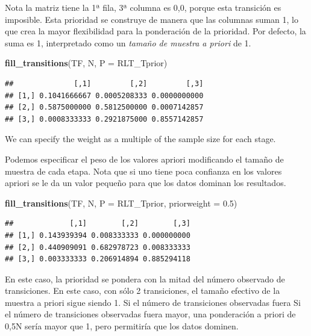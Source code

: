 \documentclass[
]{book}
\newenvironment{Shaded}{\begin{snugshade}}{\end{snugshade}}
\newcommand{\AttributeTok}[1]{\textcolor[rgb]{0.13,0.29,0.53}{#1}}
\newcommand{\FloatTok}[1]{\textcolor[rgb]{0.00,0.00,0.81}{#1}}
\newcommand{\FunctionTok}[1]{\textcolor[rgb]{0.13,0.29,0.53}{\textbf{#1}}}
\newcommand{\NormalTok}[1]{#1}
\theoremstyle{definition}
\theoremstyle{definition}
\theoremstyle{definition}
\theoremstyle{definition}
\theoremstyle{remark}
\begin{document}
Nota la matriz tiene la 1ª fila, 3ª columna es 0,0, porque esta
transición es imposible. Esta prioridad se construye de manera que las
columnas suman 1, lo que crea la mayor flexibilidad para la ponderación
de la prioridad. Por defecto, la suma es 1, interpretado como un \emph{tamaño
de muestra a priori} de 1.

\begin{Shaded}
\begin{Highlighting}[]
\FunctionTok{fill\_transitions}\NormalTok{(TF, N, }\AttributeTok{P =}\NormalTok{ RLT\_Tprior)}
\end{Highlighting}
\end{Shaded}

\begin{verbatim}
##              [,1]         [,2]         [,3]
## [1,] 0.1041666667 0.0005208333 0.0000000000
## [2,] 0.5875000000 0.5812500000 0.0007142857
## [3,] 0.0008333333 0.2921875000 0.8557142857
\end{verbatim}

We can specify the weight as a multiple of the sample size for each
stage.

Podemos especificar el peso de los valores apriori modificando el tamaño de muestra de cada etapa. Nota que si uno tiene poca confianza en los valores apriori se le da un valor pequeño para que los datos dominan los resultados.

\begin{Shaded}
\begin{Highlighting}[]
\FunctionTok{fill\_transitions}\NormalTok{(TF, N, }\AttributeTok{P =}\NormalTok{ RLT\_Tprior, }\AttributeTok{priorweight =} \FloatTok{0.5}\NormalTok{)}
\end{Highlighting}
\end{Shaded}

\begin{verbatim}
##             [,1]        [,2]        [,3]
## [1,] 0.143939394 0.008333333 0.000000000
## [2,] 0.440909091 0.682978723 0.008333333
## [3,] 0.003333333 0.206914894 0.885294118
\end{verbatim}

En este caso, la prioridad se pondera con la mitad del número observado
de transiciones. En este caso, con sólo 2 transiciones, el tamaño
efectivo de la muestra a priori sigue siendo 1. Si el número de
transiciones observadas fuera Si el número de transiciones observadas
fuera mayor, una ponderación a priori de 0,5N sería mayor que 1, pero
permitiría que los datos dominen.
\end{document}

